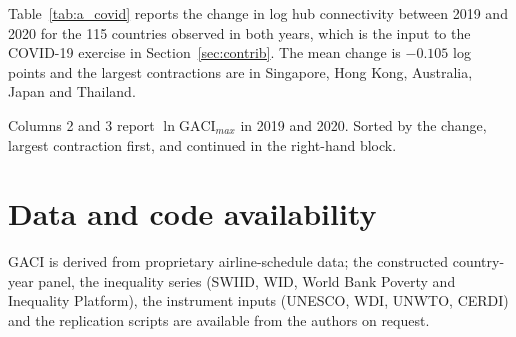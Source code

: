 Table~\ref{tab:a_covid} reports the change in log hub connectivity between 2019 and 2020 for the 115 countries observed in both years, which is the input to the COVID-19 exercise in Section~\ref{sec:contrib}. The mean change is $-0.105$ log points and the largest contractions are in Singapore, Hong Kong, Australia, Japan and Thailand.

\begin{table}[H]\centering\caption{Change in log hub connectivity, 2019 to 2020, by country.}\label{tab:a_covid}
\begin{threeparttable}\scriptsize
\begin{tablenotes}\scriptsize\item Columns 2 and 3 report $\ln\mathrm{GACI}_{max}$ in 2019 and 2020. Sorted by the change, largest contraction first, and continued in the right-hand block.\end{tablenotes}\end{threeparttable}\end{table}

\section*{Data and code availability}
GACI is derived from proprietary airline-schedule data; the constructed country-year panel, the inequality series (SWIID, WID, World Bank Poverty and Inequality Platform), the instrument inputs (UNESCO, WDI, UNWTO, CERDI) and the replication scripts are available from the authors on request.
